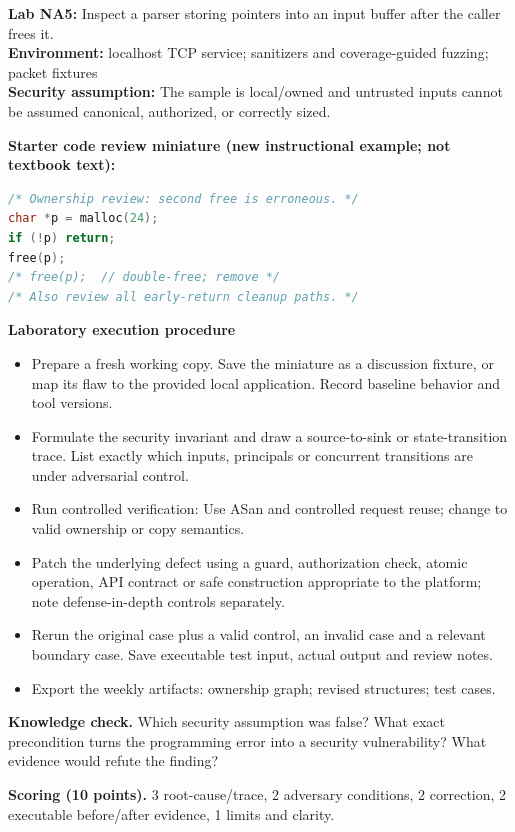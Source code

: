 \documentclass[10pt,letterpaper]{article}
\begin{document}
\begin{insight}\textbf{Lab NA5:} Inspect a parser storing pointers into an input buffer after the caller frees it.\\\textbf{Environment:} localhost TCP service; sanitizers and coverage-guided fuzzing; packet fixtures\\\textbf{Security assumption:} The sample is local/owned and untrusted inputs cannot be assumed canonical, authorized, or correctly sized.\end{insight}
\textbf{Starter code review miniature (new instructional example; not textbook text):}
\begin{lstlisting}[language=C]
/* Ownership review: second free is erroneous. */
char *p = malloc(24);
if (!p) return;
free(p);
/* free(p);  // double-free; remove */
/* Also review all early-return cleanup paths. */
\end{lstlisting}
\textbf{Laboratory execution procedure}
\begin{itemize}[leftmargin=*,itemsep=2pt]
\item Prepare a fresh working copy. Save the miniature as a discussion fixture, or map its flaw to the provided local application. Record baseline behavior and tool versions.
\item Formulate the security invariant and draw a source-to-sink or state-transition trace. List exactly which inputs, principals or concurrent transitions are under adversarial control.
\item Run controlled verification: Use ASan and controlled request reuse; change to valid ownership or copy semantics.
\item Patch the underlying defect using a guard, authorization check, atomic operation, API contract or safe construction appropriate to the platform; note defense-in-depth controls separately.
\item Rerun the original case plus a valid control, an invalid case and a relevant boundary case. Save executable test input, actual output and review notes.
\item Export the weekly artifacts: ownership graph; revised structures; test cases.
\end{itemize}
\textbf{Knowledge check.} Which security assumption was false? What exact precondition turns the programming error into a security vulnerability? What evidence would refute the finding?

\textbf{Scoring (10 points).} 3 root-cause/trace, 2 adversary conditions, 2 correction, 2 executable before/after evidence, 1 limits and clarity.
\end{document}
